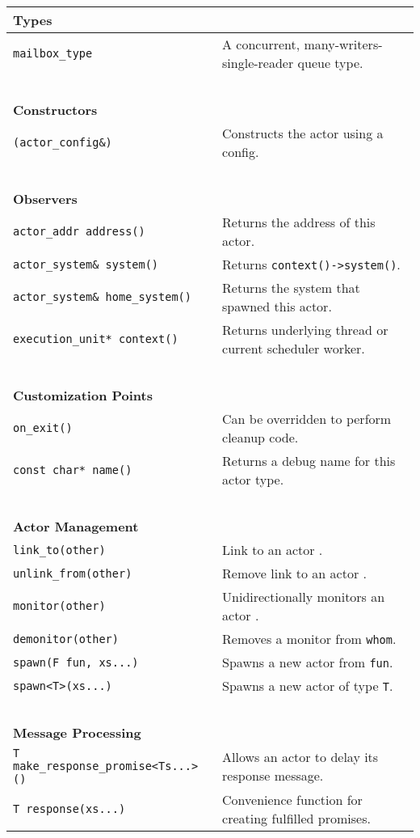 \begin{center}
\begin{tabular}{ll}
  \textbf{Types} & ~ \\
  \hline
  \lstinline^mailbox_type^ & A concurrent, many-writers-single-reader queue type. \\
  \hline
  ~ & ~ \\ \textbf{Constructors} & ~ \\
  \hline
  \lstinline^(actor_config&)^ & Constructs the actor using a config. \\
  \hline
  ~ & ~ \\ \textbf{Observers} & ~ \\
  \hline
  \lstinline^actor_addr address()^ & Returns the address of this actor. \\
  \hline
  \lstinline^actor_system& system()^ & Returns \lstinline^context()->system()^. \\
  \hline
  \lstinline^actor_system& home_system()^ & Returns the system that spawned this actor. \\
  \hline
  \lstinline^execution_unit* context()^ & Returns underlying thread or current scheduler worker. \\
  \hline
  ~ & ~ \\ \textbf{Customization Points} & ~ \\
  \hline
  \lstinline^on_exit()^ & Can be overridden to perform cleanup code. \\
  \hline
  \lstinline^const char* name()^ & Returns a debug name for this actor type. \\
  \hline
  ~ & ~ \\ \textbf{Actor Management} & ~ \\
  \hline
  \lstinline^link_to(other)^ & Link to an actor . \\
  \hline
  \lstinline^unlink_from(other)^ & Remove link to an actor . \\
  \hline
  \lstinline^monitor(other)^ & Unidirectionally monitors an actor . \\
  \hline
  \lstinline^demonitor(other)^ & Removes a monitor from \lstinline^whom^. \\
  \hline
  \lstinline^spawn(F fun, xs...)^ & Spawns a new actor from \lstinline^fun^. \\
  \hline
  \lstinline^spawn<T>(xs...)^ & Spawns a new actor of type \lstinline^T^. \\
  \hline
  ~ & ~ \\ \textbf{Message Processing} & ~ \\
  \hline
  \lstinline^T make_response_promise<Ts...>()^ & Allows an actor to delay its response message. \\
  \hline
  \lstinline^T response(xs...)^ & Convenience function for creating fulfilled promises. \\
  \hline
\end{tabular}
\end{center}

